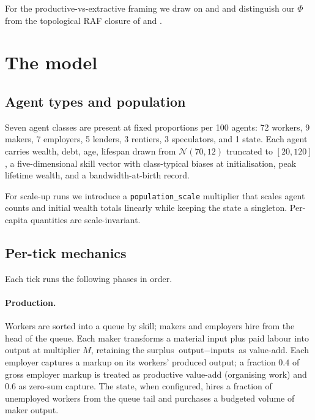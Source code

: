 \documentclass[11pt]{article}
\begin{document}
For the productive-vs-extractive framing we draw on
\citet{kauffman1988evolution} and \citet{mazzucato2018value} and
distinguish our $\Phi$ from the topological RAF closure of
\citet{hordijk2004detecting} and \citet{hordijk2023emergence}.

\section{The model}
\label{sec:model}

\subsection{Agent types and population}

Seven agent classes are present at fixed proportions per 100 agents:
72 workers, 9 makers, 7 employers, 5 lenders, 3 rentiers, 3
speculators, and 1 state.  Each agent carries wealth, debt, age,
lifespan drawn from $\mathcal{N}(70, 12)$ truncated to $[20, 120]$,
a five-dimensional skill vector with class-typical biases at
initialisation, peak lifetime wealth, and a bandwidth-at-birth
record.

For scale-up runs we introduce a \texttt{population\_scale}
multiplier that scales agent counts and initial wealth totals
linearly while keeping the state a singleton.  Per-capita quantities
are scale-invariant.

\subsection{Per-tick mechanics}

Each tick runs the following phases in order.

\paragraph{Production.}  Workers are sorted into a queue by skill;
makers and employers hire from the head of the queue.  Each maker
transforms a material input plus paid labour into output at
multiplier $M$, retaining the surplus $\text{output} - \text{inputs}$
as value-add.  Each employer captures a markup on its workers'
produced output; a fraction $0.4$ of gross employer markup is
treated as productive value-add (organising work) and $0.6$ as
zero-sum capture.  The state, when configured, hires a fraction of
unemployed workers from the queue tail and purchases a budgeted
volume of maker output.
\end{document}
